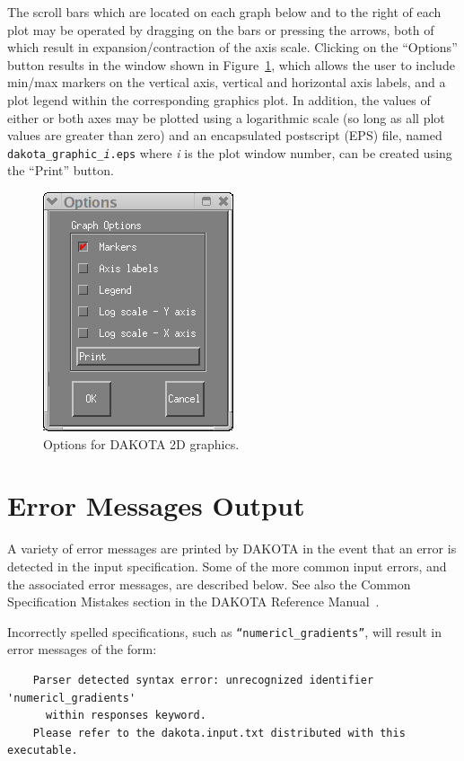 The scroll bars which are located on each graph below and to the right
of each plot may be operated by dragging on the bars or pressing the
arrows, both of which result in expansion/contraction of the axis
scale. Clicking on the ``Options'' button results in the window shown
in Figure~\ref{output:2dcontoptions}, which allows the user to include
min/max markers on the vertical axis, vertical and horizontal axis
labels, and a plot legend within the corresponding graphics plot.  In
addition, the values of either or both axes may be plotted using a
logarithmic scale (so long as all plot values are greater than zero)
and an encapsulated postscript (EPS) file, named 
\texttt{dakota\_graphic\_\emph{i}.eps} where \emph{i} is the plot 
window number, can be created using the ``Print'' button.
\begin{figure}
\centering
\includegraphics[scale=0.6]{images/container_graphic_options}
\caption{Options for DAKOTA 2D graphics.}
\label{output:2dcontoptions}
\end{figure}


\section{Error Messages Output}\label{output:error}

A variety of error messages are printed by DAKOTA in the event that an
error is detected in the input specification. Some of the more common
input errors, and the associated error messages, are described below.
See also the Common Specification Mistakes section in the DAKOTA
Reference Manual~\cite{RefMan}.

Incorrectly spelled specifications, such as 
\texttt{``numericl\_gradients''}, will result in error messages of the form:
\begin{small}
\begin{verbatim}
    Parser detected syntax error: unrecognized identifier 'numericl_gradients'
      within responses keyword.
    Please refer to the dakota.input.txt distributed with this executable.
\end{verbatim}
\end{small}

